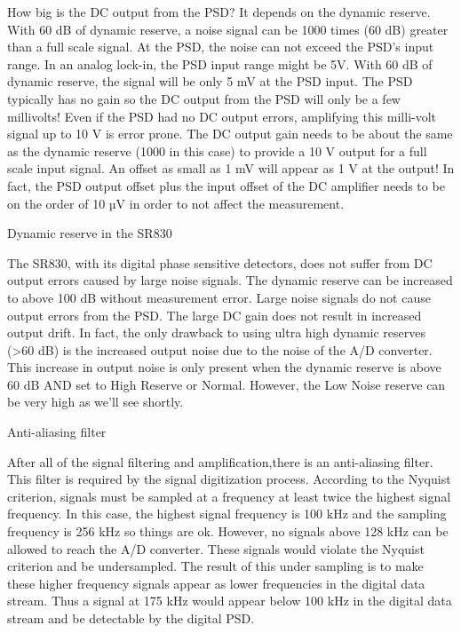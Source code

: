 \documentclass[final,5p,12pt,twocolumn]{elsaarticle}
\begin{document}
How big is the DC output from the PSD? It
depends on the dynamic reserve. With 60 dB of dynamic reserve, a noise signal can be 1000 times (60 dB) greater than a full scale signal. At the PSD, the noise can not exceed the PSD's input range. In an analog lock-in, the PSD input range might be 5V. With 60 dB of dynamic reserve, the signal will be only 5 mV at the PSD input. The PSD typically has no gain so the DC output from the PSD will only be a few millivolts! Even if the PSD had no DC output errors, amplifying this milli-volt signal up to 10 V is error prone. The DC output gain needs to be about the same as the dynamic reserve (1000 in this case) to provide a 10 V output for a full scale input signal. An offset as small as 1 mV will appear as 1 V at the output! In fact, the PSD output offset plus the input offset of the DC amplifier needs to be on the order of 10 µV in order to not affect the measurement.

Dynamic reserve in the SR830

The SR830, with its digital phase sensitive detectors, does not suffer from DC output errors caused by large noise signals. The dynamic reserve can be increased to above 100 dB without measurement error. Large noise signals do not cause output errors from the PSD. The large DC gain does not result in increased output drift. 
In fact, the only drawback to using ultra high
dynamic reserves (>60 dB) is the increased output noise due to the noise of the A/D
converter. This increase in output noise is only present when the dynamic reserve is above 60 dB AND set to High Reserve or Normal. However, the Low Noise reserve can be very high as we'll see shortly.

Anti-aliasing filter

After all of the signal filtering and amplification,there is an anti-aliasing filter. This filter is required by the signal digitization process. According to the Nyquist criterion, signals must be sampled at a frequency at least twice the highest signal frequency. In this case, the highest signal frequency is 100 kHz and the sampling frequency is 256 kHz so things are ok. However, no signals above 128 kHz can be allowed to reach the A/D converter. These signals would violate the Nyquist criterion and be undersampled. The result of this under sampling is to make these higher frequency signals appear as lower frequencies in the digital data stream. Thus a signal at 175 kHz would appear below 100 kHz in the digital data stream and be detectable by the digital PSD. 
\end{document}
